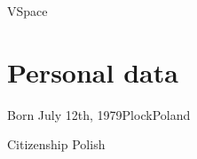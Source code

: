 

    {VSpace}

\section{Personal data}

\cventry
    {Born}
    {July 12th, 1979}{Plock}{Poland}{}{}

\cventry
    {Citizenship}
    {Polish}{}{}{}{}
